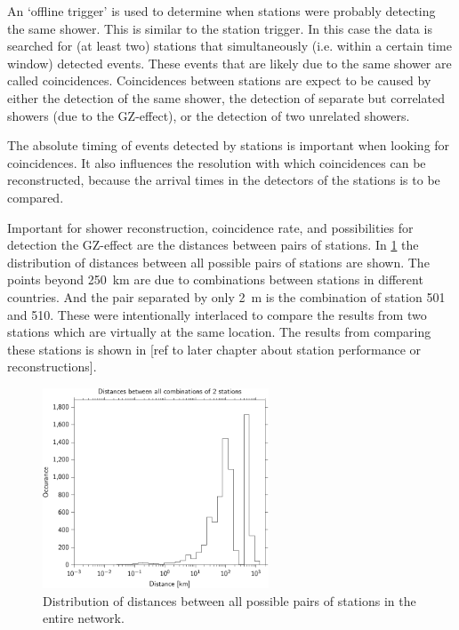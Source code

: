An `offline trigger' is used to determine when stations were probably detecting the same shower. This is similar to the station trigger. In this case the data is searched for (at least two) stations that simultaneously (i.e. within a certain time window) detected events. These events that are likely due to the same shower are called coincidences. Coincidences between stations are expect to be caused by either the detection of the same shower, the detection of separate but correlated showers (due to the GZ-effect), or the detection of two unrelated showers.

The absolute timing of events detected by stations is important when looking for coincidences. It also influences the resolution with which coincidences can be reconstructed, because the arrival times in the detectors of the stations is to be compared.

Important for shower reconstruction, coincidence rate, and possibilities for detection the GZ-effect are the distances between pairs of stations. In \cref{fig:network_station_distances} the distribution of distances between all possible pairs of stations are shown. The points beyond \SI{250}{\kilo\meter} are due to combinations between stations in different countries. And the pair separated by only \SI{2}{\meter} is the combination of station 501 and 510. These were intentionally interlaced to compare the results from two stations which are virtually at the same location. The results from comparing these stations is shown in [ref to later chapter about station performance or reconstructions].

\begin{figure}
    \centering
    \includegraphics[width=0.6\textwidth]
                    {plots/cluster/network_station_distances}
    \caption{Distribution of distances between all possible pairs of stations in the entire \hisparc network.}
    \label{fig:network_station_distances}
\end{figure}


